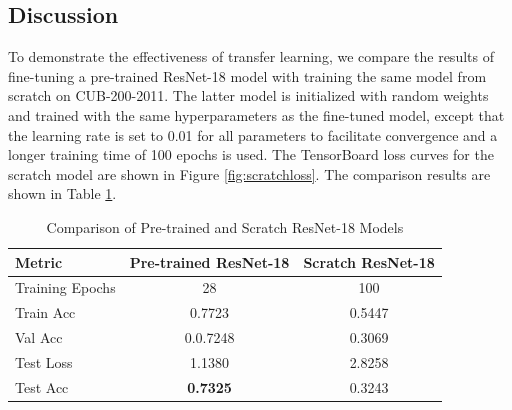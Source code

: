 \documentclass[UTF8]{ctexart}
\begin{document}
\subsection{Discussion}
To demonstrate the effectiveness of transfer learning, we compare the results of fine-tuning a pre-trained ResNet-18 model
with training the same model from scratch on CUB-200-2011.
The latter model is initialized with random weights and trained with the same hyperparameters as the fine-tuned model, except that
the learning rate is set to 0.01 for all parameters to facilitate convergence and a longer training time of 100 epochs is used.
The TensorBoard loss curves for the scratch model are shown in Figure \ref{fig:scratchloss}.
The comparison results are shown in Table \ref{tab:comparison}.

\begin{table}[h]
    \centering
    \caption{Comparison of Pre-trained and Scratch ResNet-18 Models}
    \label{tab:comparison}
    \begin{tabular}{|l|c|c|}
    \hline
    \textbf{Metric} & \textbf{Pre-trained ResNet-18} & \textbf{Scratch ResNet-18} \\ \hline
    Training Epochs & 28 & 100 \\ \hline
    Train Acc & 0.7723 & 0.5447 \\ \hline
    Val Acc & 0.0.7248 & 0.3069 \\ \hline
    Test Loss & 1.1380 & 2.8258 \\ \hline
    Test Acc & \textbf{0.7325} & 0.3243 \\ \hline
    \end{tabular}
    \end{table}
\end{document}
